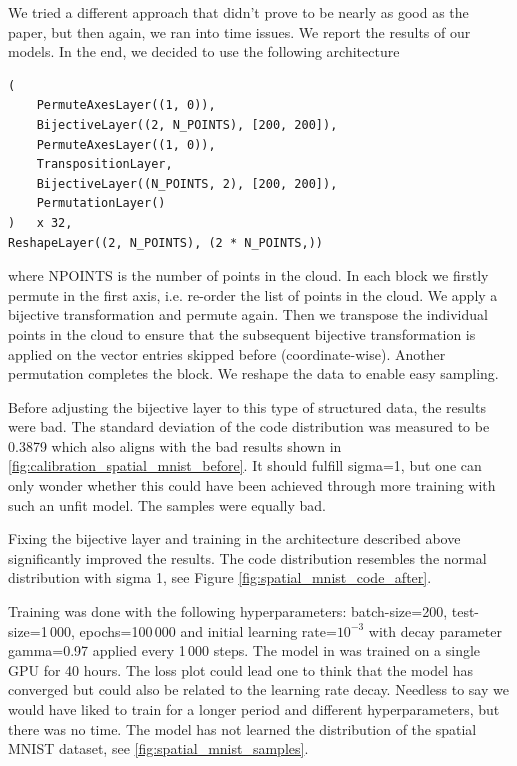We tried a different approach that didn't prove to be nearly as good as the paper, but then again, we ran into time issues. We report the results of our models. In the end, we decided to use the following architecture
\begin{verbatim}
(
    PermuteAxesLayer((1, 0)), 
    BijectiveLayer((2, N_POINTS), [200, 200]), 
    PermuteAxesLayer((1, 0)),
    TranspositionLayer, 
    BijectiveLayer((N_POINTS, 2), [200, 200]), 
    PermutationLayer()
)   x 32,
ReshapeLayer((2, N_POINTS), (2 * N_POINTS,))
\end{verbatim}
where N\textunderscore POINTS is the number of points in the cloud. In each block we firstly permute in the first axis, i.e. re-order the list of points in the cloud. We apply a bijective transformation and permute again. Then we transpose the individual points in the cloud to ensure that the subsequent bijective transformation is applied on the vector entries skipped before (coordinate-wise). Another permutation completes the block. We reshape the data to enable easy sampling.

Before adjusting the bijective layer to this type of structured data, the results were bad. The standard deviation of the code distribution was measured to be 0.3879 which also aligns with the bad results shown in \ref{fig:calibration_spatial_mnist_before}. It should fulfill sigma=1, but one can only wonder whether this could have been achieved through more training with such an unfit model. The samples were equally bad.

Fixing the bijective layer and training in the architecture described above significantly improved the results. The code distribution resembles the normal distribution with sigma 1, see Figure \ref{fig:spatial_mnist_code_after}.

Training was done with the following hyperparameters:  batch-size=200, test-size=1\,000, epochs=100\,000 and initial learning rate=$10^{-3}$ with decay parameter gamma=0.97 applied every 1\,000 steps. The model in \cite{nielsen2020survae} was trained on a single GPU for 40 hours. The loss plot could lead one to think that the model has converged but could also be related to the learning rate decay. Needless to say we would have liked to train for a longer period and different hyperparameters, but there was no time. The model has not learned the distribution of the spatial MNIST dataset, see \ref{fig:spatial_mnist_samples}.


\label{sec:image_data}

